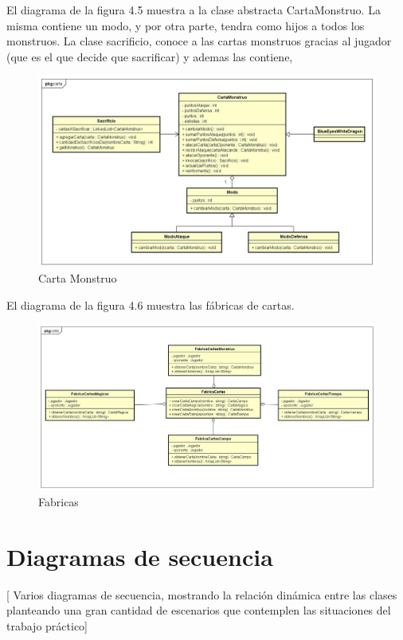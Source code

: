 El diagrama de la figura 4.5 muestra a la clase abstracta CartaMonstruo. La misma contiene un modo, y por otra parte, tendra como hijos a todos los monstruos. La clase sacrificio, conoce a las cartas monstruos gracias al jugador (que es el que decide que sacrificar) y ademas las contiene, 


\begin{figure}[H]
	\centering
	\includegraphics[scale=0.3]{includes/CartaMonstruo}
	\caption{Carta Monstruo}
	\label{CartaMonstruo}
\end{figure}

El diagrama de la figura 4.6 muestra las fábricas de cartas.

\begin{figure}[H]
	\centering
	\includegraphics[scale=0.3]{includes/Fabricas}
	\caption{Fabricas}
	\label{Fabricas}
\end{figure}

\clearpage
\section{Diagramas de secuencia}

[ Varios diagramas de secuencia, mostrando la relación dinámica entre las
clases planteando una gran cantidad de escenarios que contemplen las
situaciones del trabajo práctico]

